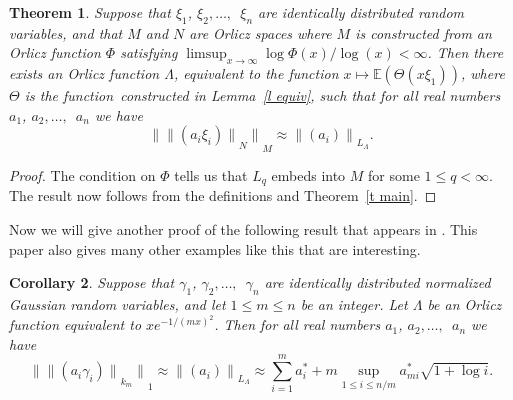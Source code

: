 \documentclass[12pt]{amsart}
\newtheorem{thm}{Theorem}
\newtheorem{cor}[thm]{Corollary}
\newcommand{\E}{{\mathbb E}}
\newcommand{\snormo}[1]{{\mathopen\|#1\mathclose\|}}
\begin{document}
\begin{thm}
\label{t orlicz}
Suppose that $\xi_1$, 
$\xi_2,\dots,$\ $\xi_n$ are identically distributed random variables,
and that $M$ and $N$ are Orlicz spaces where 
$M$ is constructed from an Orlicz function
$\Phi$ satisfying $\limsup_{x\to\infty} \log \Phi(x)/\log(x) < \infty$.
Then there exists an Orlicz
function $\Lambda$, equivalent to the function
$x\mapsto \E(\Theta(x \xi_1))$, where $\Theta$ is the function\
constructed in Lemma~\ref{l equiv}, such that for all real numbers
$a_1$, $a_2,\dots,$\ $a_n$ we have
\[
   \snormo{\snormo{(a_i \xi_i)}_N}_M \approx \snormo{(a_i)}_{L_\Lambda} .
\]
\end{thm}

\begin{proof}
The condition on $\Phi$ tells us that $L_q$ embeds into $M$ for some
$1 \le q < \infty$.
The result now follows
from the definitions and Theorem~\ref{t main}.
\end{proof}

Now we will give another proof of the following result that appears in 
\cite{gordon et al}.  This paper also gives many other examples like this
that are interesting.

\begin{cor}
Suppose that $\gamma_1$, 
$\gamma_2,\dots,$\ $\gamma_n$ are identically distributed 
normalized Gaussian
random variables,
and let $1 \le m \le n$ be an integer.
Let $\Lambda$ be an Orlicz function equivalent to $x e^{-1/(mx)^2}$.
Then for all real numbers
$a_1$, $a_2,\dots,$\ $a_n$ we have
\begin{equation}
\label{e Gauss}
   \snormo{\snormo{(a_i \gamma_i)}_{k_m}}_1 \approx \snormo{(a_i)}_{L_\Lambda} 
   \approx \sum_{i=1}^m a^*_i 
   + m \sup_{1 \le i \le n/m} a^*_{m i} \sqrt{1+\log i} .
\end{equation}
\end{cor}
\end{document}
